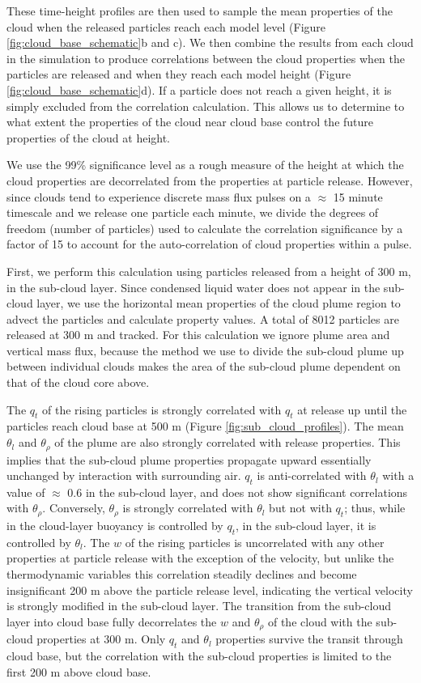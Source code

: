 \documentclass[acp]{copernicus}
\begin{document}
These time-height profiles are then used to sample the mean properties of the 
cloud when the released particles reach each model level (Figure 
\ref{fig:cloud_base_schematic}b and c).  We then combine the results from each 
cloud in the simulation to produce correlations between the cloud properties 
when the particles are released and when they reach each model height (Figure 
\ref{fig:cloud_base_schematic}d).  If a particle does not reach a given 
height, it is simply excluded from the correlation calculation.  This allows us 
to determine to what extent the properties of the cloud near cloud base control 
the future properties of the cloud at height.

We use the 99\% significance level as a rough measure of the height at which 
the cloud properties are decorrelated from the properties at particle release.  
However, since clouds tend to experience discrete mass flux pulses on a 
$\approx$ 15 minute timescale and we release one particle each minute, we 
divide the degrees of freedom (number of particles) used to calculate the 
correlation significance by a factor of 15 to account for the auto-correlation 
of cloud properties within a pulse.

First, we perform this calculation using particles released from a height of 
300 m, in the sub-cloud layer.  Since condensed liquid water does not appear in 
the sub-cloud layer, we use the horizontal mean properties of the cloud plume 
region to advect the particles and calculate property values.  A total of 8012 
particles are released at 300 m and tracked.  For this calculation we ignore 
plume area and vertical mass flux, because the method we use to divide the 
sub-cloud plume up between individual clouds makes the area of the sub-cloud 
plume dependent on that of the cloud core above.

The $q_t$ of the rising particles is strongly correlated with $q_t$ at release 
up until the particles reach cloud base at 500 m (Figure 
\ref{fig:sub_cloud_profiles}).  The mean $\theta_l$ and $\theta_\rho$ of 
the plume are also strongly correlated with release properties.  This implies 
that the sub-cloud plume properties propagate upward essentially unchanged by 
interaction with surrounding air.  $q_t$ is anti-correlated with $\theta_l$ 
with a value of $\approx$ 0.6 in the sub-cloud layer, and does not show 
significant correlations with $\theta_\rho$.  Conversely, $\theta_\rho$ is 
strongly correlated with $\theta_l$ but not with $q_t$; thus, while in the 
cloud-layer buoyancy is controlled by $q_t$, in the sub-cloud layer, it is 
controlled by $\theta_l$.  The $w$ of the rising particles is uncorrelated 
with any other properties at particle release with the exception of the 
velocity, but unlike the thermodynamic variables this correlation steadily 
declines and become insignificant 200 m above the particle release level, 
indicating the vertical velocity is strongly modified in the sub-cloud layer.  
The transition from the sub-cloud layer into cloud base fully decorrelates the 
$w$ and $\theta_\rho$ of the cloud with the sub-cloud properties at 300 m.
Only $q_t$ and $\theta_l$ properties survive the transit through cloud base, 
but the correlation with the sub-cloud properties is limited to the first 200 m 
above cloud base.
\end{document}
